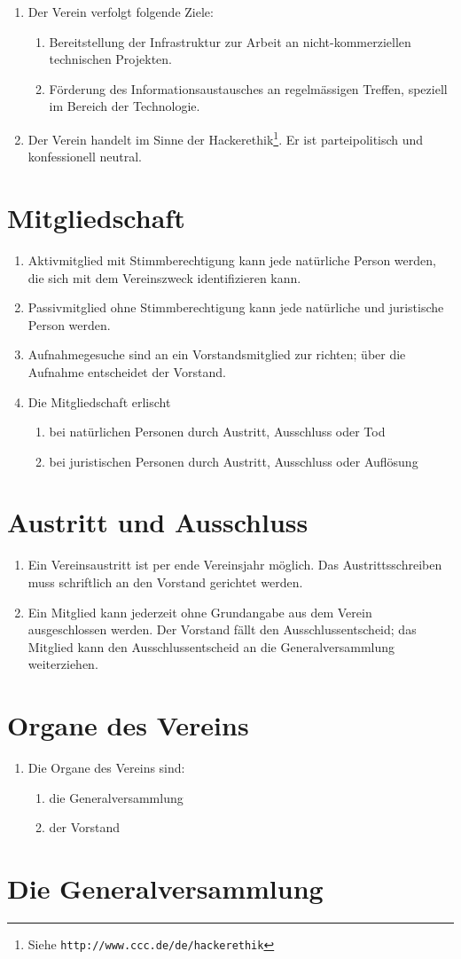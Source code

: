 \documentclass[10pt,a4paper,parskip,fleqn]{scrartcl}
\newcommand{\ol}{\begin{enumerate}[itemsep=-0.2em,topsep=-0.2em]}
\newcommand{\lo}{\end{enumerate}}
\newcommand{\li}{\item}
\begin{document}
\ol
	\li Der Verein verfolgt folgende Ziele:
    \ol
      \li Bereitstellung der Infrastruktur zur Arbeit an nicht-kommerziellen
			technischen Projekten.
      \li Förderung des Informationsaustausches an regelmässigen Treffen,
			speziell im Bereich der Technologie.
    \lo
		\li Der Verein handelt im Sinne der
		Hackerethik\footnote{Siehe \texttt{http://www.ccc.de/de/hackerethik}}. Er
		ist parteipolitisch und konfessionell neutral.
\lo


\section{Mitgliedschaft}

\ol
  \li Aktivmitglied mit Stimmberechtigung kann jede natürliche Person werden,
	die sich mit dem Vereinszweck identifizieren kann.
	\li Passivmitglied ohne Stimmberechtigung kann jede natürliche und juristische
	Person werden.
	\li Aufnahmegesuche sind an ein Vorstandsmitglied zur richten; über die
	Aufnahme entscheidet der Vorstand.
	\li Die Mitgliedschaft erlischt
		\ol
			\li bei natürlichen Personen durch Austritt, Ausschluss oder Tod
			\li bei juristischen Personen durch Austritt, Ausschluss oder Auflösung
		\lo
\lo


\section{Austritt und Ausschluss}

\ol
	\li Ein Vereinsaustritt ist per ende Vereinsjahr möglich. Das
	Austrittsschreiben muss schriftlich an den Vorstand gerichtet werden.
	\li Ein Mitglied kann jederzeit ohne Grundangabe aus dem Verein ausgeschlossen
	werden. Der Vorstand fällt den Ausschlussentscheid; das Mitglied kann den
	Ausschlussentscheid an die Generalversammlung weiterziehen.
\lo


\section{Organe des Vereins}

\ol
	\li Die Organe des Vereins sind:
		\ol
			\li die Generalversammlung
			\li der Vorstand
		\lo
\lo


\section{Die Generalversammlung}
\end{document}
